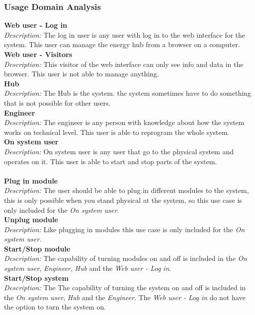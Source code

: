 	\subsubsection{Usage Domain Analysis}
		\textbf{Web user - Log in}
		\\\textit{Description: }
		The log in user is any user with log in to the web interface for the system. This user can manage the energy hub from a browser on a computer.
		\\\textbf{Web user - Visitors}
		\\\textit{Description: }
		This visitor of the web interface can only see info and data in the browser. This user is not able to manage anything.
		\\\textbf{Hub}
		\\\textit{Description: }
		The Hub is the system. the system sometimes have to do something that is not possible for other users.
		\\\textbf{Engineer}
		\\\textit{Description: }
		The engineer is any person with knowledge about how the system works on technical level. This user is able to reprogram the whole system.
		\\\textbf{On system user}
		\\\textit{Description: }
		On system user is any user that go to the physical system and operates on it. This user is able to start and stop parts of the system.
		\\\\\textbf{Plug in module}
		\\\textit{Description: }
		The user should be able to plug in different modules to the system, this is only possible when you stand physical at the system, so this use case is only included for the \textit{On system user}.
		\\\textbf{Unplug module}
		\\\textit{Description: }
		Like plugging in modules this use case is only included for the \textit{On system user}.
		\\\textbf{Start/Stop module}
		\\\textit{Description: }
		The capability of turning modules on and off is included in the \textit{On system user}, \textit{Engineer}, \textit{Hub} and the \textit{Web user - Log in}.
		\\\textbf{Start/Stop system}
		\\\textit{Description: }
		The The capability of turning the system on and off is included in the \textit{On system user}, \textit{Hub} and the \textit{Engineer}. The \textit{Web user - Log in} do not have the option to turn the system on.
